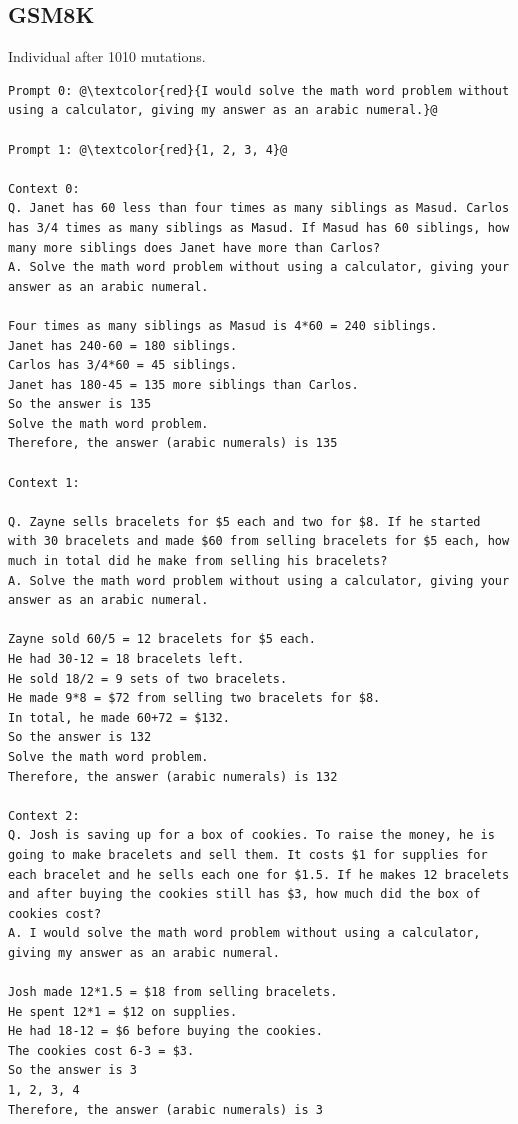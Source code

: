 \documentclass{article} %
\begin{document}
\subsection{GSM8K}
Individual after 1010 mutations.

\begin{tcolorbox}
\begin{lstlisting}[escapechar=@]
Prompt 0: @\textcolor{red}{I would solve the math word problem without using a calculator, giving my answer as an arabic numeral.}@

Prompt 1: @\textcolor{red}{1, 2, 3, 4}@

Context 0: 
Q. Janet has 60 less than four times as many siblings as Masud. Carlos has 3/4 times as many siblings as Masud. If Masud has 60 siblings, how many more siblings does Janet have more than Carlos?
A. Solve the math word problem without using a calculator, giving your answer as an arabic numeral.

Four times as many siblings as Masud is 4*60 = 240 siblings.
Janet has 240-60 = 180 siblings.
Carlos has 3/4*60 = 45 siblings.
Janet has 180-45 = 135 more siblings than Carlos.
So the answer is 135
Solve the math word problem.
Therefore, the answer (arabic numerals) is 135

Context 1: 

Q. Zayne sells bracelets for $5 each and two for $8. If he started with 30 bracelets and made $60 from selling bracelets for $5 each, how much in total did he make from selling his bracelets?
A. Solve the math word problem without using a calculator, giving your answer as an arabic numeral.

Zayne sold 60/5 = 12 bracelets for $5 each.
He had 30-12 = 18 bracelets left.
He sold 18/2 = 9 sets of two bracelets.
He made 9*8 = $72 from selling two bracelets for $8.
In total, he made 60+72 = $132.
So the answer is 132
Solve the math word problem.
Therefore, the answer (arabic numerals) is 132

Context 2: 
Q. Josh is saving up for a box of cookies. To raise the money, he is going to make bracelets and sell them. It costs $1 for supplies for each bracelet and he sells each one for $1.5. If he makes 12 bracelets and after buying the cookies still has $3, how much did the box of cookies cost?
A. I would solve the math word problem without using a calculator, giving my answer as an arabic numeral.

Josh made 12*1.5 = $18 from selling bracelets.
He spent 12*1 = $12 on supplies.
He had 18-12 = $6 before buying the cookies.
The cookies cost 6-3 = $3.
So the answer is 3
1, 2, 3, 4
Therefore, the answer (arabic numerals) is 3
\end{lstlisting}
\end{tcolorbox}
\end{document}
